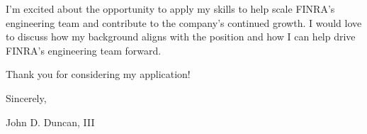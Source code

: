 \documentclass[]{article}
\begin{document}
I'm excited about the opportunity to apply my skills to help scale FINRA's engineering team and contribute to the company's continued growth. I would love to discuss how my background aligns with the position and how I can help drive FINRA's engineering team forward. 

Thank you for considering my application!

Sincerely,

John D. Duncan, III









\end{document}
